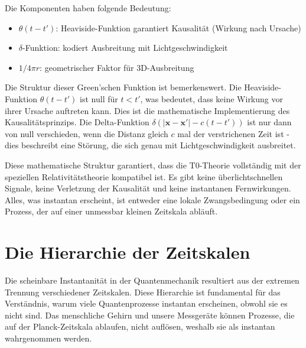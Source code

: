 	Die Komponenten haben folgende Bedeutung:
	\begin{itemize}
		\item $\theta(t-t')$: Heaviside-Funktion garantiert Kausalität (Wirkung nach Ursache)
		\item $\delta$-Funktion: kodiert Ausbreitung mit Lichtgeschwindigkeit
		\item $1/4\pi r$: geometrischer Faktor für 3D-Ausbreitung
	\end{itemize}
	
	Die Struktur dieser Green'schen Funktion ist bemerkenswert. Die Heaviside-Funktion $\theta(t-t')$ ist null für $t < t'$, was bedeutet, dass keine Wirkung vor ihrer Ursache auftreten kann. Dies ist die mathematische Implementierung des Kausalitätsprinzips. Die Delta-Funktion $\delta(|\mathbf{x}-\mathbf{x}'| - c(t-t'))$ ist nur dann von null verschieden, wenn die Distanz gleich $c$ mal der verstrichenen Zeit ist - dies beschreibt eine Störung, die sich genau mit Lichtgeschwindigkeit ausbreitet.
	
	Diese mathematische Struktur garantiert, dass die T0-Theorie vollständig mit der speziellen Relativitätstheorie kompatibel ist. Es gibt keine überlichtschnellen Signale, keine Verletzung der Kausalität und keine instantanen Fernwirkungen. Alles, was instantan erscheint, ist entweder eine lokale Zwangsbedingung oder ein Prozess, der auf einer unmessbar kleinen Zeitskala abläuft.
	
	\section{Die Hierarchie der Zeitskalen}
	
	Die scheinbare Instantanität in der Quantenmechanik resultiert aus der extremen Trennung verschiedener Zeitskalen. Diese Hierarchie ist fundamental für das Verständnis, warum viele Quantenprozesse instantan erscheinen, obwohl sie es nicht sind. Das menschliche Gehirn und unsere Messgeräte können Prozesse, die auf der Planck-Zeitskala ablaufen, nicht auflösen, weshalb sie als instantan wahrgenommen werden.
	

